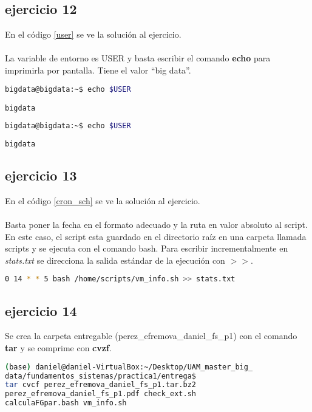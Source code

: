 \subsection*{ejercicio 12}
%
En el código \ref{user} se ve la solución al ejercicio.\\\\
La variable de entorno es USER y basta escribir el comando \textbf{echo} para imprimirla por pantalla. Tiene el valor ``big data''.
\begin{lstlisting}[language=bash,caption={variable de entorno con usuario el actual}, label={user}]
bigdata@bigdata:~$ echo $USER

bigdata
\end{lstlisting}
\begin{lstlisting}[language=bash,caption={variable de entorno con usuario el actual}, label={user}]
bigdata@bigdata:~$ echo $USER
	
bigdata
\end{lstlisting}
\subsection*{ejercicio 13}
%
En el código \ref{cron_sch} se ve la solución al ejercicio.\\\\
Basta poner la fecha en el formato adecuado y la ruta en valor absoluto al script. En este caso, el script esta guardado en el directorio raíz en una carpeta llamada scripts y se ejecuta con el comando bash. Para escribir incrementalmente en \textit{stats.txt} se direcciona la salida estándar de la ejecución con $>>$.
\begin{lstlisting}[language=bash,caption={Planificación con crontab}, label={cron_sch}]
0 14 * * 5 bash /home/scripts/vm_info.sh >> stats.txt
\end{lstlisting}
\subsection*{ejercicio 14}
%
Se crea la carpeta entregable (perez\_efremova\_daniel\_fs\_p1) con el comando \textbf{tar} y se comprime con \textbf{cvzf}.
\begin{lstlisting}[language=bash,caption={Compresión para la entrega}, label={tar_entrega}]
(base) daniel@daniel-VirtualBox:~/Desktop/UAM_master_big_
data/fundamentos_sistemas/practica1/entrega$ 
tar cvcf perez_efremova_daniel_fs_p1.tar.bz2 
perez_efremova_daniel_fs_p1.pdf check_ext.sh 
calculaFGpar.bash vm_info.sh 
\end{lstlisting}